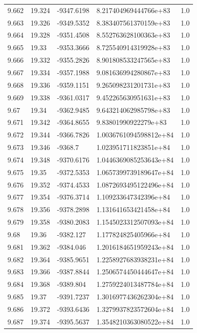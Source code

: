 \begin{tabular}{lllll}
9.662 & 19.324 & -9347.6198 & 8.217404969444766e+83 & 1.0 \\
9.663 & 19.326 & -9349.5352 & 8.383407561370159e+83 & 1.0 \\
9.664 & 19.328 & -9351.4508 & 8.552763628100363e+83 & 1.0 \\
9.665 & 19.33 & -9353.3666 & 8.725540914319928e+83 & 1.0 \\
9.666 & 19.332 & -9355.2826 & 8.901808533247565e+83 & 1.0 \\
9.667 & 19.334 & -9357.1988 & 9.081636994280867e+83 & 1.0 \\
9.668 & 19.336 & -9359.1151 & 9.265098231201731e+83 & 1.0 \\
9.669 & 19.338 & -9361.0317 & 9.452265630951631e+83 & 1.0 \\
9.67 & 19.34 & -9362.9485 & 9.643214062985798e+83 & 1.0 \\
9.671 & 19.342 & -9364.8655 & 9.83801990922279e+83 & 1.0 \\
9.672 & 19.344 & -9366.7826 & 1.0036761094598812e+84 & 1.0 \\
9.673 & 19.346 & -9368.7 & 1.023951711823851e+84 & 1.0 \\
9.674 & 19.348 & -9370.6176 & 1.0446369085253643e+84 & 1.0 \\
9.675 & 19.35 & -9372.5353 & 1.0657399739189647e+84 & 1.0 \\
9.676 & 19.352 & -9374.4533 & 1.0872693495122496e+84 & 1.0 \\
9.677 & 19.354 & -9376.3714 & 1.109233647342396e+84 & 1.0 \\
9.678 & 19.356 & -9378.2898 & 1.131641653421458e+84 & 1.0 \\
9.679 & 19.358 & -9380.2083 & 1.1545023312507093e+84 & 1.0 \\
9.68 & 19.36 & -9382.127 & 1.177824825405966e+84 & 1.0 \\
9.681 & 19.362 & -9384.046 & 1.2016184651959243e+84 & 1.0 \\
9.682 & 19.364 & -9385.9651 & 1.2258927683938231e+84 & 1.0 \\
9.683 & 19.366 & -9387.8844 & 1.2506574450444647e+84 & 1.0 \\
9.684 & 19.368 & -9389.804 & 1.2759224013487784e+84 & 1.0 \\
9.685 & 19.37 & -9391.7237 & 1.3016977436262304e+84 & 1.0 \\
9.686 & 19.372 & -9393.6436 & 1.3279937823572604e+84 & 1.0 \\
9.687 & 19.374 & -9395.5637 & 1.3548210363080522e+84 & 1.0 \\

\end{tabular}
